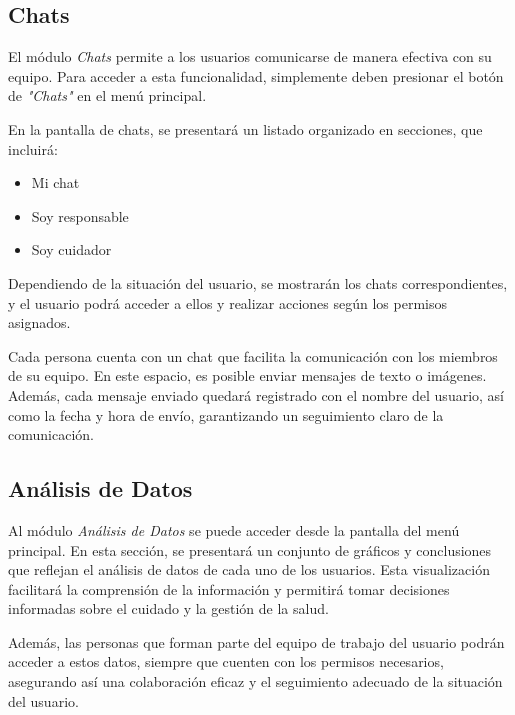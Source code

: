 \documentclass[a4paper,12pt]{article}
\begin{document}
    \subsection{Chats}
    \par El módulo \textit{Chats} permite a los usuarios comunicarse de manera efectiva con su equipo. Para acceder a esta funcionalidad, simplemente deben presionar el botón de \textit{"Chats"} en el menú principal.
    \par En la pantalla de chats, se presentará un listado organizado en secciones, que incluirá:
    \begin{itemize}
        \item Mi chat
        \item Soy responsable
        \item Soy cuidador
    \end{itemize}
    \par Dependiendo de la situación del usuario, se mostrarán los chats correspondientes, y el usuario podrá acceder a ellos y realizar acciones según los permisos asignados.
    \par Cada persona cuenta con un chat que facilita la comunicación con los miembros de su equipo. En este espacio, es posible enviar mensajes de texto o imágenes. Además, cada mensaje enviado quedará registrado con el nombre del usuario, así como la fecha y hora de envío, garantizando un seguimiento claro de la comunicación.
    \subsection{Análisis de Datos}
    \par Al módulo \textit{Análisis de Datos} se puede acceder desde la pantalla del menú principal. En esta sección, se presentará un conjunto de gráficos y conclusiones que reflejan el análisis de datos de cada uno de los usuarios. Esta visualización facilitará la comprensión de la información y permitirá tomar decisiones informadas sobre el cuidado y la gestión de la salud.
    \par Además, las personas que forman parte del equipo de trabajo del usuario podrán acceder a estos datos, siempre que cuenten con los permisos necesarios, asegurando así una colaboración eficaz y el seguimiento adecuado de la situación del usuario.
\end{document}
